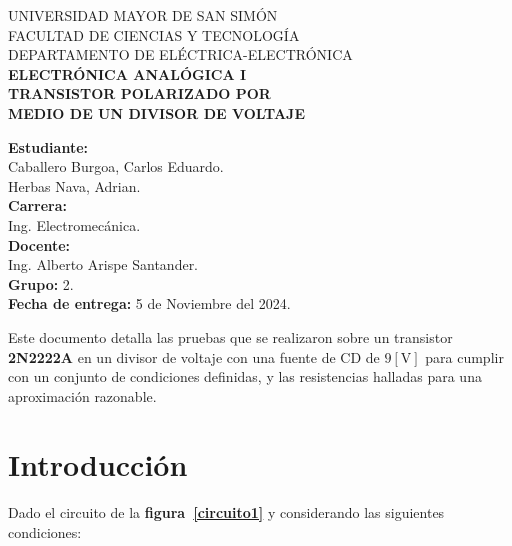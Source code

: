 \documentclass[letter,twoside,11pt]{article}
\newcommand{\blankpage}{
\newpage
\thispagestyle{empty}
\mbox{}
\newpage
}
\begin{document}
\begin{titlepage}
    \begin{center}
        {\Large UNIVERSIDAD MAYOR DE SAN SIMÓN}\\
        \vspace*{0.15cm}
        {\large FACULTAD DE CIENCIAS Y TECNOLOGÍA}\\
        \vspace*{0.10cm}
        DEPARTAMENTO DE ELÉCTRICA-ELECTRÓNICA\\
        \vspace*{3.0cm}
        {\Large \textbf{ELECTRÓNICA ANALÓGICA I}}\\
        \vspace*{3.5cm}
        {\Large \textbf{TRANSISTOR POLARIZADO POR \\ MEDIO DE UN DIVISOR DE VOLTAJE}}\\
    \end{center}

    \vspace*{6.1cm}
    \leftskip=7.95cm
    \noindent
    \textbf{Estudiante:}\\
    Caballero Burgoa, Carlos Eduardo.\\
    Herbas Nava, Adrian.\\
    \newline
    \textbf{Carrera:}\\
    Ing. Electromecánica.\\
    \newline
    \textbf{Docente:}\\
    Ing. Alberto Arispe Santander.\\
    \newline
    \textbf{Grupo:} 2.\\
    \textbf{Fecha de entrega:} 5 de Noviembre del 2024.\\
\end{titlepage}
\addtocounter{page}{-1}

\blankpage
\addtocounter{page}{-1}

Este documento detalla las pruebas que se realizaron sobre un transistor
\textbf{2N2222A} en un divisor de voltaje con una fuente de CD de
$9[\text{V}]$ para cumplir con un conjunto de condiciones definidas, y las
resistencias halladas para una aproximación razonable.

\section{Introducción}
Dado el circuito de la \textbf{figura~\ref{circuito1}} y considerando las
siguientes condiciones:
\end{document}
